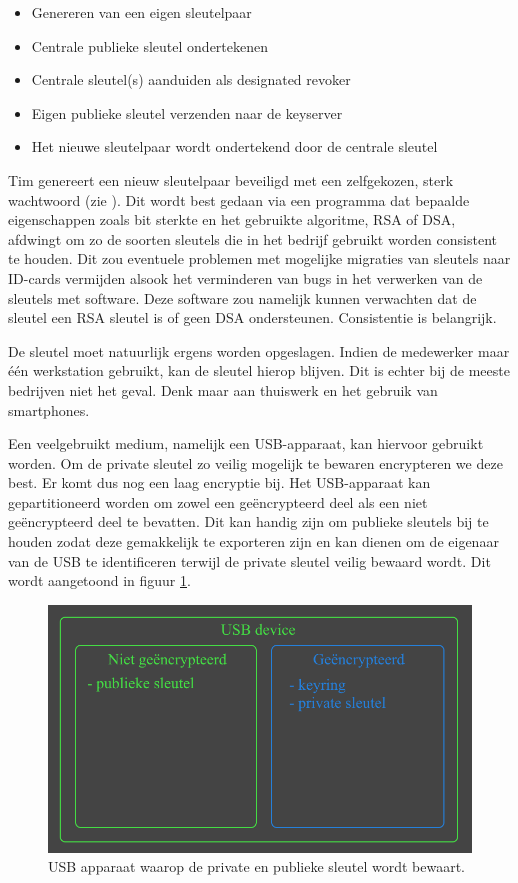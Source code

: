 \begin{itemize}
	\item Genereren van een eigen sleutelpaar
	\item Centrale publieke sleutel ondertekenen
	\item Centrale sleutel(s) aanduiden als designated revoker
	\item Eigen publieke sleutel verzenden naar de keyserver
	\item Het nieuwe sleutelpaar wordt ondertekend door de centrale sleutel
\end{itemize}

Tim genereert een nieuw sleutelpaar beveiligd met een zelfgekozen, sterk
wachtwoord (zie ). Dit wordt best gedaan via een
programma dat bepaalde eigenschappen zoals bit sterkte en het gebruikte
algoritme, RSA of DSA, afdwingt om zo de soorten sleutels die in het bedrijf
gebruikt worden consistent te houden. Dit zou eventuele problemen met mogelijke
migraties van sleutels naar ID-cards vermijden alsook het verminderen van bugs
in het verwerken van de sleutels met software. Deze software zou namelijk kunnen
verwachten dat de sleutel een RSA sleutel is of geen DSA ondersteunen.
Consistentie is belangrijk.

De sleutel moet natuurlijk ergens worden opgeslagen. Indien de medewerker maar
één werkstation gebruikt, kan de sleutel hierop blijven. Dit is echter bij de
meeste bedrijven niet het geval. Denk maar aan thuiswerk en het gebruik van
smartphones.

Een veelgebruikt medium, namelijk een USB-apparaat, kan hiervoor gebruikt
worden. Om de private sleutel zo veilig mogelijk te bewaren encrypteren we deze
best. Er komt dus nog een laag encryptie bij. Het USB-apparaat kan
gepartitioneerd worden om zowel een geëncrypteerd deel als een niet
geëncrypteerd deel te bevatten. Dit kan handig zijn om publieke sleutels bij te
houden zodat deze gemakkelijk te exporteren zijn en kan dienen om de eigenaar
van de USB te identificeren terwijl de private sleutel veilig bewaard wordt. Dit
wordt aangetoond in figuur \ref{fig:usb-device}.

\begin{figure}[H]
	\includegraphics[width=\textwidth,keepaspectratio]{img/usb-store-with-gpg-keys.png}
	\centering
	\caption{USB apparaat waarop de private en publieke sleutel wordt bewaart.}
	\label{fig:usb-device}
\end{figure}


